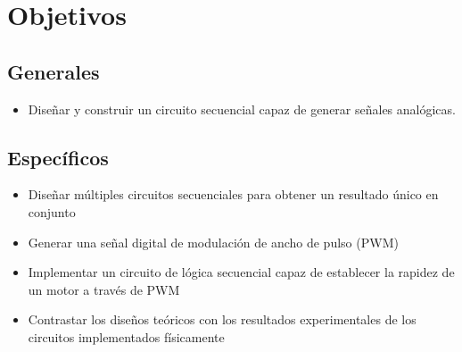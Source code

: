 
\section*{Objetivos}
\subsection*{Generales}
\begin{itemize}
    \item Diseñar y construir un circuito secuencial capaz de generar señales analógicas.
\end{itemize}

\subsection*{Específicos}
\begin{itemize}
    \item Diseñar múltiples circuitos secuenciales para obtener un resultado único en conjunto
    \item Generar una señal digital de modulación de ancho de pulso (PWM)
    \item Implementar un circuito de lógica secuencial capaz de establecer la rapidez de un motor a través de PWM
    \item Contrastar los diseños teóricos con los resultados experimentales de los circuitos implementados físicamente
\end{itemize}



